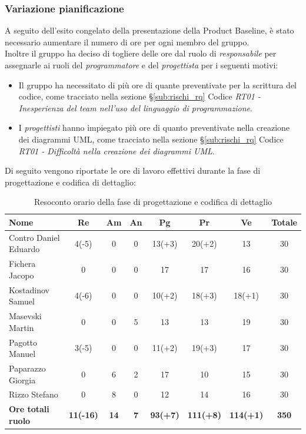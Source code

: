 \documentclass[../piano_di_progetto.tex]{subfiles}
\begin{document}
\subsubsection{Variazione pianificazione}
A seguito dell'esito congelato della presentazione della Product Baseline, è stato necessario aumentare il numero di ore per ogni membro del gruppo.\\
Inoltre il gruppo ha deciso di togliere delle ore dal ruolo di \emph{responsabile} per assegnarle ai ruoli del \emph{programmatore} e del \emph{progettista} per i seguenti motivi:
\begin{itemize}
	\item Il gruppo ha necessitato di più ore di quante preventivate per la scrittura del codice, come tracciato nella sezione \S\ref{sub:rischi_rq} Codice \emph{RT01 - Inesperienza del team nell'uso del linguaggio di programmazione}. %
	\item I \emph{progettisti} hanno impiegato più ore di quanto preventivate nella creazione dei diagrammi UML, come tracciato nella sezione \S\ref{sub:rischi_rq} Codice \emph{RT01 - Difficoltà nella creazione dei diagrammi UML}.
\end{itemize}

\noindent Di seguito vengono riportate le ore di lavoro effettivi durante la fase di progettazione e codifica di dettaglio: \\
\begin{table}[!ht]
	\centering
	\begin{tabular}{|l|c|c|c|c|c|c|c|}
	\hline
	\rowcolor{lightgray}
	\textbf{Nome} & \textbf{Re} & \textbf{Am} & \textbf{An} & \textbf{Pg}  & \textbf{Pr}   & \textbf{Ve} & \textbf{Totale}\\
	\hline
	Contro Daniel Eduardo & 4(-5) & 0 & 0 & 13(+3) & 20(+2) & 13 & 30 \\
	Fichera Jacopo & 0 & 0 & 0 & 17 & 17 & 16 & 30 \\
	Kostadinov Samuel & 4(-6) & 0 & 0 & 10(+2) & 18(+3) & 18(+1) & 30 \\			
	Masevski Martin & 0 & 0 & 5 & 13 & 13 & 19 & 30 \\
	Pagotto Manuel & 3(-5) & 0 & 0 & 11(+2) & 19(+3) & 17 & 30 \\			
	Paparazzo Giorgia & 0 & 6 & 2 & 17 & 10 & 15 & 30 \\
	Rizzo Stefano & 0 & 8 & 0 & 12 & 14 & 16 & 30 \\
	\hline
	\textbf{Ore totali ruolo} & \textbf{11(-16)} & \textbf{14} & \textbf{7} & \textbf{93(+7)} & \textbf{111(+8)} & \textbf{114(+1)} & \textbf{350} \\
	\hline
	\end{tabular}
	\caption{Resoconto orario della fase di progettazione e codifica di dettaglio}
\end{table}
\end{document}
